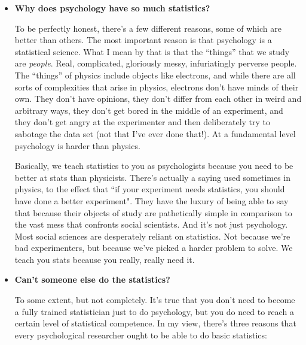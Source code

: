 \begin{itemize}

\item {\bf Why does psychology have so much statistics?}

To be perfectly honest, there's a few different reasons, some of which are better than others. The most important reason is that psychology is a statistical science. What I mean by that is that the ``things'' that we study are {\it people}. Real, complicated, gloriously messy, infuriatingly perverse people. The ``things'' of physics include objects like electrons, and while there are all sorts of complexities that arise in physics, electrons don't have minds of their own. They don't have opinions, they don't differ from each other in weird and arbitrary ways, they don't get bored in the middle of an experiment, and they don't get angry at the experimenter and then deliberately try to sabotage the data set (not that I've ever done that!). At a fundamental level psychology is harder than physics.

Basically, we teach statistics to you as psychologists because you need to be better at stats than physicists. There's actually a saying used sometimes in physics, to the effect that ``if your experiment needs statistics, you should have done a better experiment". They have the luxury of being able to say that because their objects of study are pathetically simple in comparison to the vast mess that confronts social scientists. And it's not just psychology. Most social sciences are desperately reliant on statistics. Not because we're bad experimenters, but because we've picked a harder problem to solve. We teach you stats because you really, really need it.

\item {\bf Can't someone else do the statistics?}

To some extent, but not completely. It's true that you don't need to become a fully trained statistician just to do psychology, but you do need to reach a certain level of statistical competence. In my view, there's three reasons that every psychological researcher ought to be able to do basic statistics:


\end{itemize}
